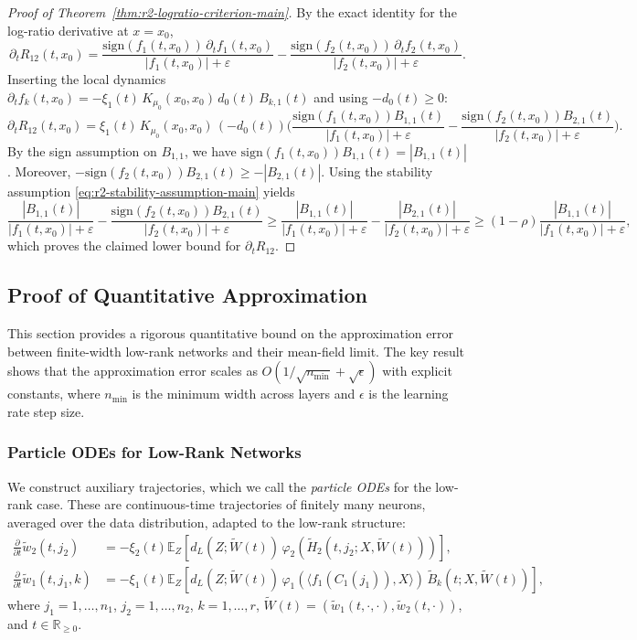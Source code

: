 \documentclass[11pt]{article}
\newcommand{\1}{\mathbbm{1}}
\begin{document}
\begin{proof}[Proof of Theorem~\ref{thm:r2-logratio-criterion-main}]
By the exact identity for the log-ratio derivative at $x=x_0$,
\[
\partial_t R_{12}(t,x_0)=\frac{\mathrm{sign}(f_1(t,x_0))\,\partial_t f_1(t,x_0)}{|f_1(t,x_0)|+\varepsilon}
-\frac{\mathrm{sign}(f_2(t,x_0))\,\partial_t f_2(t,x_0)}{|f_2(t,x_0)|+\varepsilon}.
\]
Inserting the local dynamics $\partial_t f_k(t,x_0)=-\xi_1(t)\,K_{\mu_0}(x_0,x_0)\,d_0(t)\,B_{k,1}(t)$ and using $-d_0(t)\ge 0$:
\[
\partial_t R_{12}(t,x_0)=\xi_1(t)\,K_{\mu_0}(x_0,x_0)\,(-d_0(t))\Big(
\frac{\mathrm{sign}(f_1(t,x_0))B_{1,1}(t)}{|f_1(t,x_0)|+\varepsilon}-\frac{\mathrm{sign}(f_2(t,x_0))B_{2,1}(t)}{|f_2(t,x_0)|+\varepsilon}\Big).
\]
By the sign assumption on $B_{1,1}$, we have $\mathrm{sign}(f_1(t,x_0))B_{1,1}(t)=|B_{1,1}(t)|$. Moreover, $-\mathrm{sign}(f_2(t,x_0))B_{2,1}(t)\ge -|B_{2,1}(t)|$. Using the stability assumption \eqref{eq:r2-stability-assumption-main} yields
\[
\frac{|B_{1,1}(t)|}{|f_1(t,x_0)|+\varepsilon}-\frac{\mathrm{sign}(f_2(t,x_0))B_{2,1}(t)}{|f_2(t,x_0)|+\varepsilon}
\ge \frac{|B_{1,1}(t)|}{|f_1(t,x_0)|+\varepsilon}-\frac{|B_{2,1}(t)|}{|f_2(t,x_0)|+\varepsilon}
\ge (1-\rho)\frac{|B_{1,1}(t)|}{|f_1(t,x_0)|+\varepsilon},
\]
which proves the claimed lower bound for $\partial_t R_{12}$.
\end{proof}

\subsection{Proof of Quantitative Approximation}
\label{app:quantitative-proof}

This section provides a rigorous quantitative bound on the approximation error between finite-width low-rank networks and their mean-field limit. The key result shows that the approximation error scales as $O(1/\sqrt{n_{\min}} + \sqrt{\epsilon})$ with explicit constants, where $n_{\min}$ is the minimum width across layers and $\epsilon$ is the learning rate step size.

\subsubsection{Particle ODEs for Low-Rank Networks}

We construct auxiliary trajectories, which we call the \textit{particle ODEs} for the low-rank case. These are continuous-time trajectories of finitely many neurons, averaged over the data distribution, adapted to the low-rank structure:
\begin{align*}
\frac{\partial}{\partial t}\tilde{w}_2(t, j_2) &= -\xi_2(t)\mathbb{E}_Z\left[d_L(Z; \tilde{W}(t))\,\varphi_2(\tilde{H}_2(t, j_2; X, \tilde{W}(t)))\right],\\
\frac{\partial}{\partial t}\tilde{w}_1(t, j_1, k) &= -\xi_1(t)\mathbb{E}_Z\left[d_L(Z; \tilde{W}(t))\,\varphi_1(\langle f_1(C_1(j_1)), X\rangle)\,\tilde{B}_k(t; X, \tilde{W}(t))\right],
\end{align*}
where $j_1 = 1, \ldots, n_1$, $j_2 = 1, \ldots, n_2$, $k = 1, \ldots, r$, $\tilde{W}(t) = (\tilde{w}_1(t, \cdot, \cdot), \tilde{w}_2(t, \cdot))$, and $t \in \mathbb{R}_{\ge 0}$. 
\end{document}
